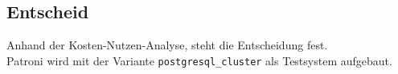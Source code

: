 
\begin{flushleft}
    \subsection{Entscheid}
    Anhand der Kosten-Nutzen-Analyse, steht die Entscheidung fest.\\
    Patroni wird mit der Variante \texttt{postgresql\_cluster} als Testsystem aufgebaut.
\end{flushleft}